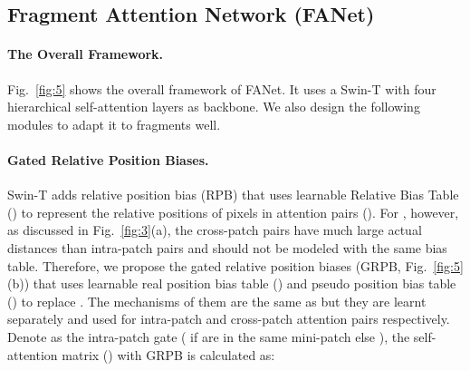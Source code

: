 \documentclass[runningheads]{llncs}
\begin{document}
\begin{comment}
\paragraph{Preserving temporal quality: temporal alignment.} It is widely recognized by early works \cite{deepvqa,tlvqm,pvq} that inter-frame temporal variations are influential to video qualities. We strictly align the sample areas across frames during patch sampling  (constraint in Eq.~\ref{eq:2}), and note the spliced and temporally aligned mini-patches as \frag~). 

Denote  as crops in  horizontally and  vertically of frame  in  ,  as the patch sampling operation for frame , the whole pipeline for Grid Mini-patch Sampling (GMS) is expressed as follows:

 
\end{comment}




\subsection{Fragment Attention Network (FANet)}\label{section:fanet}



\paragraph{The Overall Framework.} Fig.~\ref{fig:5} shows the overall framework of FANet. It uses a Swin-T with four hierarchical self-attention layers as backbone. We also design the following modules to adapt it to fragments well.
\paragraph{Gated Relative Position Biases.} Swin-T adds relative position bias (RPB) that uses learnable Relative Bias Table () to represent the relative positions of pixels in attention pairs (). For \frag, however, as discussed in Fig.~\ref{fig:3}(a), the cross-patch pairs have much large actual distances than intra-patch pairs and should not be modeled with the same bias table. Therefore, we propose the gated relative position biases (GRPB, Fig.~\ref{fig:5}(b)) that uses learnable real position bias table () and pseudo position bias table () to replace . 
The mechanisms of them are the same as  but they are learnt separately and used for intra-patch and cross-patch attention pairs respectively.
Denote  as the intra-patch gate ( if  are in the same mini-patch else ), the self-attention matrix () with GRPB is calculated as:
\end{document}

